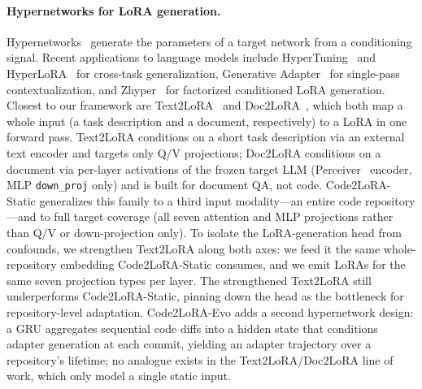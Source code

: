 \documentclass{llmxive}
\providecommand{\codelora}{Code2LoRA\xspace}
\providecommand{\codelorastatic}{\codelora-Static\xspace}
\providecommand{\codeloraevo}{\codelora-Evo\xspace}
\providecommand{\textlora}{Text2LoRA\xspace}
\providecommand{\doclora}{Doc2LoRA\xspace}
\begin{document}
\paragraph{Hypernetworks for LoRA generation.}
Hypernetworks~\cite{ha2017hypernetworks} generate the parameters of a target network from a conditioning signal.
Recent applications to language models include HyperTuning~\cite{phang2023hypertuning} and HyperLoRA~\cite{von2024language} for cross-task generalization, Generative Adapter~\cite{chen2025generativeadapter} for single-pass contextualization, and Zhyper~\cite{abdalla2025zhyper} for factorized conditioned LoRA generation.
Closest to our framework are \textlora{}~\cite{charakorn2025text2lora} and \doclora{}~\cite{charakorn2026doctolora}, which both map a whole input (a task description and a document, respectively) to a LoRA in one forward pass.
\textlora{} conditions on a short task description via an external text encoder and targets only Q/V projections; \doclora{} conditions on a document via per-layer activations of the frozen target LLM (Perceiver~\cite{jaegle2021perceiver} encoder, MLP \texttt{down\_proj} only) and is built for document QA, not code.
\codelorastatic{} generalizes this family to a third input modality---an entire code repository---and to full target coverage (all seven attention and MLP projections rather than Q/V or down-projection only).
To isolate the LoRA-generation head from confounds, we strengthen \textlora{} along both axes: we feed it the same whole-repository embedding \codelorastatic{} consumes, and we emit LoRAs for the same seven projection types per layer.
The strengthened \textlora{} still underperforms \codelorastatic{}, pinning down the head as the bottleneck for repository-level adaptation.
\codeloraevo{} adds a second hypernetwork design: a GRU aggregates sequential code diffs into a hidden state that conditions adapter generation at each commit, yielding an adapter trajectory over a repository's lifetime; no analogue exists in the \textlora{}/\doclora{} line of work, which only model a single static input.
\end{document}
